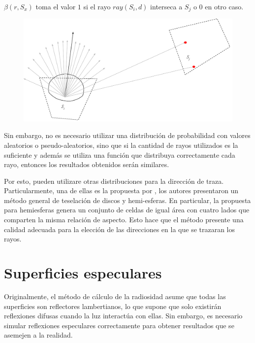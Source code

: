 $\beta(r, S_{x})$ toma el valor $1$ si el rayo $ray(S_{i},d)$ interseca a $S_{j}$ o $0$ en otro caso.

\vspace{5mm}
\begin{figure}[H]
	\centering
	\includegraphics[width=\linewidth]{assets/Raytracing}
	\label{img:ff}
\end{figure}

Sin embargo, no es necesario utilizar una distribución de probabilidad con valores aleatorios o pseudo-aleatorios, sino que si la cantidad de rayos utilizados es la suficiente y además se utiliza una función que distribuya correctamente cada rayo, entonces los resultados obtenidos serán similares.

Por esto, pueden utilizare otras distribuciones para la dirección de traza. Particularmente, una de ellas es la propuesta por \citeauthor{Beckers}, los autores presentaron un método general de teselación de discos y hemi-esferas. En particular, la propuesta para hemiesferas genera un conjunto de celdas de igual área con cuatro lados que comparten la misma relación de aspecto. Esto hace que el método presente una calidad adecuada para la elección de las direcciones en la que se trazaran los rayos.
\section{Superficies especulares}

Originalmente, el método de cálculo de la radiosidad asume que todas las superficies son reflectores lambertianos, lo que supone que solo existirán reflexiones difusas cuando la luz interactúa con ellas. Sin embargo, es necesario simular reflexiones especulares correctamente para obtener resultados que se asemejen a la realidad.

